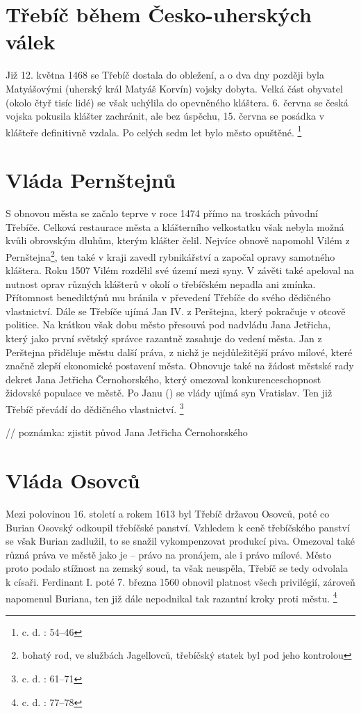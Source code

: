 \documentclass[a4paper,oneside,12p]{report}
\begin{document}
\section{Třebíč během Česko-uherských válek}

Již 12. května 1468 se Třebíč dostala do obležení, a o dva dny později byla Matyášovými (uherský král Matyáš Korvín) vojsky dobyta.
Velká část obyvatel (okolo čtyř tisíc lidé) se však uchýlila do opevněného kláštera.
6. června se česká vojska pokusila klášter zachránit, ale bez úspěchu, 15. června se posádka v klášteře definitivně vzdala.
Po celých sedm let bylo město opuštěné. \footnote{c. d. : 54--46}

\section{Vláda Pernštejnů}

S obnovou města se začalo teprve v roce 1474 přímo na troskách původní Třebíče.
Celková restaurace města a klášterního velkostatku však nebyla možná kvůli obrovským dluhům, kterým klášter čelil.
Nejvíce obnově napomohl Vilém z Pernštejna\footnote{bohatý rod, ve službách Jagellovců, třebíčský statek byl pod jeho kontrolou}, ten také v kraji zavedl rybnikářství a započal opravy samotného kláštera.
Roku 1507 Vilém rozdělil své území mezi syny. V závěti také apeloval na nutnost oprav různých klášterů v okolí o třebíčském nepadla ani zmínka.
Přítomnost benediktýnů mu bránila v převedení Třebíče do svého dědičného vlastnictví.
Dále se Třebíče ujímá Jan IV. z Perštejna, který pokračuje v otcově politice.
Na krátkou však dobu město přesouvá pod nadvládu Jana Jetřicha, který jako první světský správce razantně zasahuje do vedení města.
Jan z Perštejna přiděluje městu další práva, z nichž je nejdůležitější právo mílové, které značně zlepší ekonomické postavení města.
Obnovuje také na žádost městské rady dekret Jana Jetřicha Černohorského, který omezoval konkurenceschopnost židovské populace ve městě.
Po Janu () se vlády ujímá syn Vratislav.
Ten již Třebíč převádí do dědičného vlastnictví. \footnote{c. d. : 61--71}


// poznámka: zjistit původ Jana Jetřicha Černohorského
\section{Vláda Osovců}

Mezi polovinou 16. století a rokem 1613 byl Třebíč državou Osovců, poté co Burian Osovský odkoupil třebíčské panství.
Vzhledem k ceně třebíčského panství se však Burian zadlužil, to se snažil vykompenzovat produkcí piva.
Omezoval také různá práva ve městě jako je -- právo na pronájem, ale i právo mílové.
Město proto podalo stížnost na zemský soud, ta však neuspěla, Třebíč se tedy odvolala k císaři.
Ferdinant I. poté 7. března 1560 obnovil platnost všech privilégií, zároveň napomenul Buriana, ten již dále nepodnikal tak razantní kroky proti městu. \footnote{c. d. : 77--78}
\end{document}
